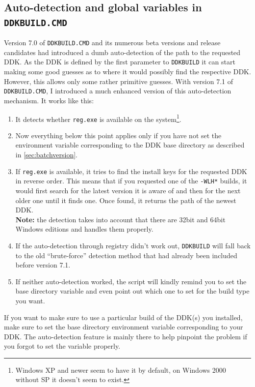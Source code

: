 \documentclass[a4paper,titlepage]{report}
\begin{document}
\subsection{Auto-detection and global variables in \texttt{DDKBUILD.CMD}}
Version 7.0 of \texttt{DDKBUILD.CMD} and its numerous beta versions and release candidates
had introduced a dumb auto-detection of the path to the requested DDK. As the DDK is
defined by the first parameter to \texttt{DDKBUILD} it can start making some good guesses
as to where it would possibly find the respective DDK. However, this allows only some
rather primitive guesses. With version 7.1 of \texttt{DDKBUILD.CMD}, I introduced a much
enhanced version of this auto-detection mechanism. It works like this:
\begin{enumerate}
  \item It detects whether \texttt{reg.exe} is available on the system\footnote{Windows XP
        and newer seem to have it by default, on Windows 2000 without SP it doesn't seem to
        exist.}.
  \item Now everything below this point applies only if you have not set the environment
        variable corresponding to the DDK base directory as described in \autoref{sec:batchversion}.
  \item If \texttt{reg.exe} is available, it tries to find the install keys for the
        requested DDK in reverse order. This means that if you requested one of the \verb+-WLH*+
        builds, it would first search for the latest version it is aware of and then for
        the next older one until it finds one. Once found, it returns the path of the newest DDK.\\
        \textbf{Note:} the detection takes into account that there are 32bit and 64bit Windows
        editions and handles them properly.
  \item If the auto-detection through registry didn't work out, \texttt{DDKBUILD} will fall back
        to the old ``brute-force'' detection method that had already been included before version 7.1.
  \item If neither auto-detection worked, the script will kindly remind you to set the base directory
        variable and even point out which one to set for the build type you want.
\end{enumerate}
If you want to make sure to use a particular build of the DDK(s) you installed, make sure to set the
base directory environment variable corresponding to your DDK. The auto-detection feature is mainly
there to help pinpoint the problem if you forgot to set the variable properly.
\end{document}
